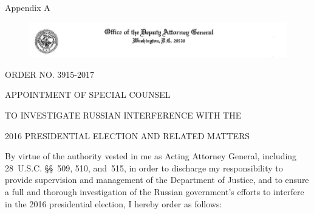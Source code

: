 
\thispagestyle{empty}

\vspace*{15em}

\begin{center}

\Huge
Appendix A

\end{center}

\cleardoublepage

\begin{figure}[ht]
    \vspace{-20pt}
    \begin{center}
        \includegraphics[width=8.25in]{images/appendix-a-header.png}%
    \end{center}
    \vspace{-20pt}
\end{figure}

\begin{center}
ORDER NO. 3915-2017

APPOINTMENT OF SPECIAL COUNSEL

TO INVESTIGATE RUSSIAN INTERFERENCE WITH THE

2016 PRESIDENTIAL ELECTION AND RELATED MATTERS
\end{center}

By virtue of the authority vested in me as Acting Attorney General, including 28~U.S.C. \S\S~509, 510, and~515, in order to discharge my responsibility to provide supervision and management of the Department of Justice, and to ensure a full and thorough investigation of the Russian government's efforts to interfere in the 2016 presidential election, I hereby order as follows:

